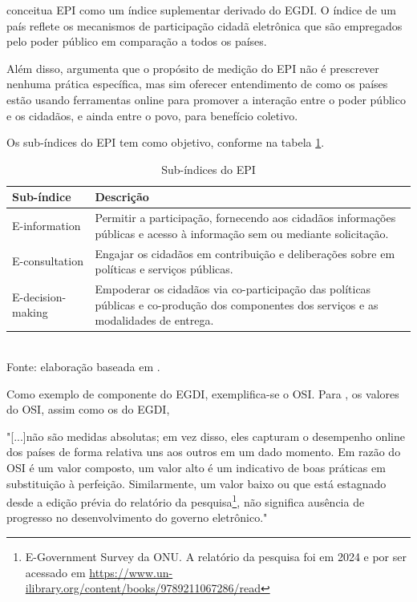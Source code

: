 \cite{ONU_EGDI_EPI_description} conceitua EPI como um índice suplementar derivado do EGDI. O índice de um país reflete os mecanismos de participação cidadã eletrônica que são empregados pelo poder público em comparação a todos os países.

Além disso, \cite{ONU_EGDI_EPI_description} argumenta que o propósito de medição do EPI não é prescrever nenhuma prática específica, mas sim oferecer entendimento de como os países estão usando ferramentas online para promover a interação entre o poder público e os cidadãos, e ainda entre o povo, para benefício coletivo.

Os sub-índices do EPI tem como objetivo, conforme \cite{ONU_EGDI_EPI_description} na tabela \ref{tab:epi_subindices}.

\begin{table}[H]
	\centering
	\label{tab:epi_subindices}
	\caption{Sub-índices do EPI}
	\begin{tabular}{@{}lp{10cm}@{}}
		\toprule
		\textbf{Sub-índice} & \textbf{Descrição} \\ \midrule
		E-information & Permitir a participação, fornecendo aos cidadãos informações públicas e acesso à informação sem ou mediante solicitação. \\ \midrule
		E-consultation & Engajar os cidadãos em contribuição e deliberações sobre em políticas e serviços públicas. \\ \midrule
		E-decision-making & Empoderar os cidadãos via co-participação das políticas públicas e co-produção dos componentes dos serviços e as modalidades de entrega. \\ \bottomrule
	\end{tabular}
	\\ \footnotesize{Fonte: elaboração baseada em \cite{ONU_EGDI_EPI_description}.}
\end{table}

Como exemplo de componente do EGDI, exemplifica-se o OSI. Para \cite{onu_egov_survey_2024}, os valores do OSI, assim como os do EGDI, 

\noindent
\begin{flushleft}
	\setlength{\leftskip}{4cm}
	\small
	"[...]não são medidas absolutas; em vez disso, eles capturam o desempenho online dos países de forma relativa uns aos outros em um dado momento. Em razão do OSI é um valor composto, um valor alto é um indicativo de boas práticas em substituição à perfeição. Similarmente, um valor baixo ou que está estagnado desde a edição prévia do relatório da pesquisa\footnote{E-Government Survey da ONU. A relatório da pesquisa foi em 2024 e por ser acessado em \url{https://www.un-ilibrary.org/content/books/9789211067286/read}}, não significa ausência de progresso no desenvolvimento do governo eletrônico." \cite{onu_egov_survey_2024}
\end{flushleft}

